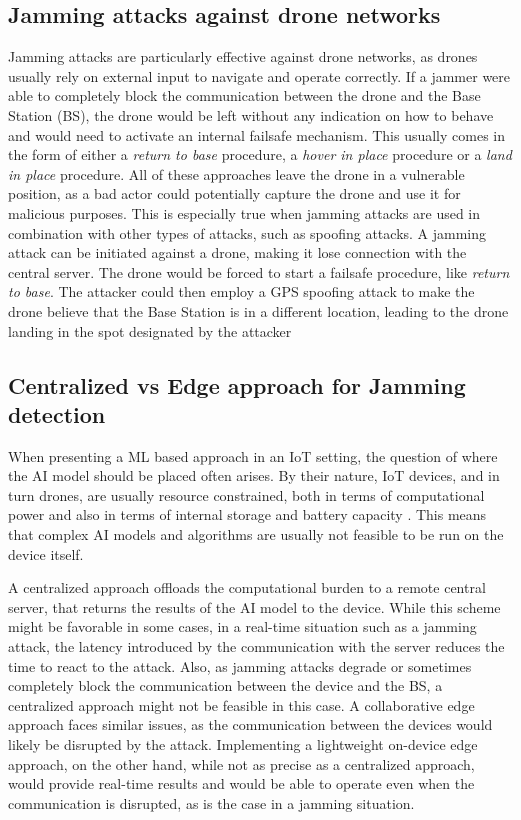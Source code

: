\documentclass[futureinternet,article,submit,pdftex,moreauthors]{Definitions/mdpi}
\begin{document}
\subsection{Jamming attacks against drone networks}\label{JammingDroneNetworks}

Jamming attacks are particularly effective against drone networks, as drones usually rely on external input to navigate and operate correctly.
If a jammer were able to completely block the communication between the drone and the Base Station (BS), the drone would be left without any indication on how to behave and would need to activate an internal failsafe mechanism. 
This usually comes in the form of either a \textit{return to base} procedure, a \textit{hover in place} procedure or a \textit{land in place} procedure.
All of these approaches leave the drone in a vulnerable position, as a bad actor could potentially capture the drone and use it for malicious purposes.
This is especially true when jamming attacks are used in combination with other types of attacks, such as spoofing attacks. A jamming attack can be initiated against a drone, making it lose connection with the central server. 
The drone would be forced to start a failsafe procedure, like \textit{return to base}. The attacker could then employ a GPS spoofing attack to make the drone believe that the Base Station is in a different location, leading to the drone landing in the spot designated by the attacker \cite{RQ170DroneOwano}

\subsection{Centralized vs Edge approach for Jamming detection}

When presenting a ML based approach in an IoT setting, the question of where the AI model should be placed often arises. By their nature, IoT devices, and in turn drones, are usually resource constrained, 
both in terms of computational power and also in terms of internal storage and battery capacity \cite{6GSecurity-Chorti}. This means that complex AI models and algorithms are usually not feasible to be run on the device itself. 

A centralized approach offloads the computational burden to a remote central server, that returns the results of the AI model to the device. While this scheme might be favorable in some cases, in a real-time situation such as a jamming attack, the latency introduced by the
communication with the server reduces the time to react to the attack. Also, as jamming attacks degrade or sometimes completely block the communication between the device and the BS, a centralized approach might not be feasible in this case.
A collaborative edge approach faces similar issues, as the communication between the devices would likely be disrupted by the attack. 
Implementing a lightweight on-device edge approach, on the other hand, while not as precise as a centralized approach, would provide real-time results and would be able to operate even when the communication is disrupted, as is the case in a jamming situation. 
\end{document}
